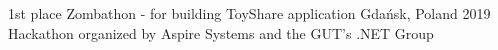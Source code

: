 
\begin{cvhonors}

  \cvhonor
    {1st place} %
    {Zombathon - for building ToyShare application} %
    {Gdańsk, Poland} %
    {2019} %
    {Hackathon organized by Aspire Systems and the GUT's .NET Group} %
 \end{cvhonors}

